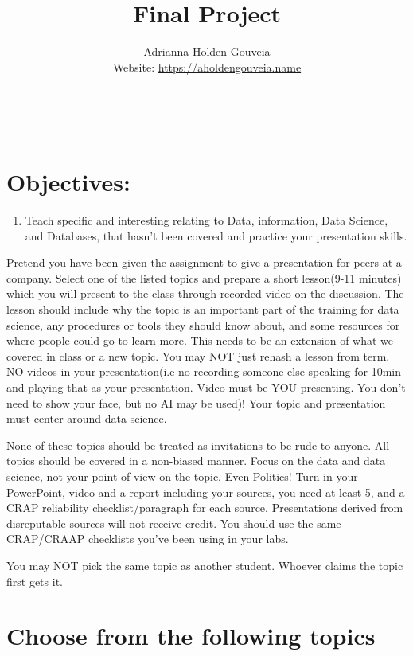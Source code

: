 \documentclass[12pt]{article}
\title{Final Project}
\author{
        Adrianna Holden-Gouveia \\
        Website: \url{https://aholdengouveia.name}\\ 
        \date{\vspace{-5ex}}
        \faLinkedin{: aholdengouveia} \\
        \faGithub {: aholdengouveia} \\
        }
\begin{document}
    

\maketitle


\section*{Objectives:}
\begin{enumerate}
    \item Teach specific and interesting relating to Data, information, Data Science, and Databases, that hasn't been covered and practice your presentation skills.
\end{enumerate}

Pretend you have been given the assignment to give a presentation for peers at a company. Select one of the listed topics and prepare a short lesson(9-11 minutes) which you will present to the class through recorded video on the discussion. The lesson should include why the topic is an important part of the training for data science, any procedures or tools they should know about, and some resources for where people could go to learn more.  This needs to be an extension of what we covered in class or a new topic.  You may NOT just rehash a lesson from term.  NO videos in your presentation(i.e no recording someone else speaking for 10min and playing that as your presentation.  Video must be YOU presenting. You don't need to show your face, but no AI may be used)! Your topic and presentation must center around data science. 

None of these topics should be treated as invitations to be rude to anyone.  All topics should be covered in a non-biased manner.  Focus on the data and data science, not your point of view on the topic.  Even Politics!
Turn in your PowerPoint, video and a report including your sources, you need at least 5, and a CRAP reliability checklist/paragraph for each source. Presentations derived from disreputable sources will not receive credit.  You should use the same CRAP/CRAAP checklists you've been using in your labs.

You may NOT pick the same topic as another student. Whoever claims the topic first gets it.

\section*{Choose from the following topics}
\end{document}

